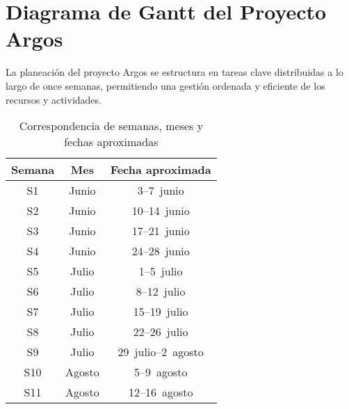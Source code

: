 \section{Diagrama de Gantt del Proyecto Argos}

La planeación del proyecto Argos se estructura en tareas clave distribuidas a lo largo de once semanas, permitiendo una gestión ordenada y eficiente de los recursos y actividades.

\begin{table}[htbp]
  \centering
  \caption{Correspondencia de semanas, meses y fechas aproximadas}
  \begin{tabular}{ccc}
    \toprule
    \rowcolor{gray!30}
    \textbf{Semana} & \textbf{Mes} & \textbf{Fecha aproximada} \\
    \midrule
    S1  & Junio  & 3--7~junio \\
    S2  & Junio  & 10--14~junio \\
    S3  & Junio  & 17--21~junio \\
    S4  & Junio  & 24--28~junio \\
    S5  & Julio  & 1--5~julio \\
    S6  & Julio  & 8--12~julio \\
    S7  & Julio  & 15--19~julio \\
    S8  & Julio  & 22--26~julio \\
    S9  & Julio  & 29~julio--2~agosto \\
    S10 & Agosto & 5--9~agosto \\
    S11 & Agosto & 12--16~agosto \\
    \bottomrule
  \end{tabular}
  \label{tab:semanas_meses_fechas}
\end{table}


